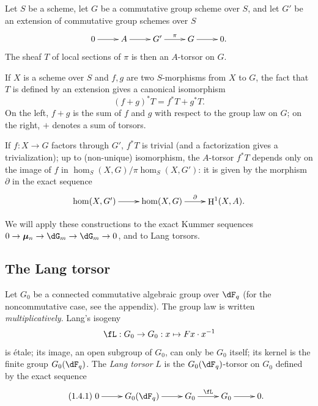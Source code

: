 \documentclass[oneside]{book}
\DeclareMathOperator{\h}{H}
\newcommand{\dmu}{{\bm\mu}}
\theoremstyle{sga-source}
\theoremstyle{sga-source-dash}
\theoremstyle{sga-source-dotdash}
\theoremstyle{sga-source-number-note-dash}
\theoremstyle{sga-source-note-number-dotdash}
\theoremstyle{sga-source-example-dotdash}
\theoremstyle{sga-source-inline-number}
\theoremstyle{sga-source-bare-number}
\theoremstyle{sga-source}
\newcommand{\PrintPage}[1]{}\newcommand{\MathPage}[1]{}\newcommand{\PrintCite}[2]{#1}\newcommand{\var}[3]{#1}
\begin{document}
\subsection{}\label{VI:1-3}

Let $S$ be a scheme, let $G$ be a commutative group scheme over $S$, and let $G'$ 
be an extension of commutative group schemes over $S$
\[\xymatrix{
  0 \ar[r] 
    & A \ar[r] 
    & G' \ar[r]^-\pi 
    & G \ar[r] 
    & 0 \text{.}
}\]
The sheaf $T$ of local sections of $\pi$ is then an $A$-torsor on 
$G$. 

\PrintPage{171}
If $X$ is a scheme over $S$ and $f,g$ are two $S$-morphisms from $X$ to $G$, 
the fact that $T$ is defined by an extension gives a canonical isomorphism 
\begin{equation*}\tag{1.3.1}\label{VI:eq:1-3-1}
  (f+g)^\ast T = f^\ast T + g^\ast T \text{.}
\end{equation*}
On the left, $f+g$ is the sum of $f$ and $g$ with respect to the group law on $G$; 
on the right, $+$ denotes a sum of torsors. 

If $f:X\to G$ factors through $G'$, $f^\ast T$ is trivial (and a 
factorization gives a trivialization); up to (non-unique) isomorphism, 
the $A$-torsor $f^\ast T$ depends only on the image of $f$ in 
$\hom_S(X,G)/\pi\hom_S(X,G')$: it is given by the morphism $\partial$ in 
the exact sequence 
\[\xymatrix{
  \hom(X,G') \ar[r] 
    & \hom(X,G) \ar[r]^-\partial 
    & \h^1(X,A) \text{.}
}\]

We will apply these constructions to the exact Kummer sequences 
$0 \to \dmu_n \to \dG_m \to \dG_m \to 0$, and to Lang torsors. 





\subsection{The Lang torsor}\label{VI:1-4}

Let $G_0$ be a connected commutative algebraic group over $\dF_q$ (for the 
noncommutative case, see the appendix). The group law is written 
\emph{multiplicatively}. Lang's isogeny 
\[
\fL:G_0 \to G_0: x\mapsto F x\cdot x^{-1}
\]
is étale; its image, an open subgroup of $G_0$, can only be 
$G_0$ itself; its kernel is the finite group $G_0(\dF_q)$. The \emph{Lang 
torsor} $L$ is the $G_0(\dF_q)$-torsor on $G_0$ defined by the exact sequence 
\begin{equation*}\tag{1.4.1}\label{VI:eq:1-4-1}
\xymatrix{
  0 \ar[r] 
    & G_0(\dF_q) \ar[r] 
    & G_0 \ar[r]^-\fL 
    & G_0 \ar[r] 
    & 0 \text{.}
}
\end{equation*}
\end{document}

